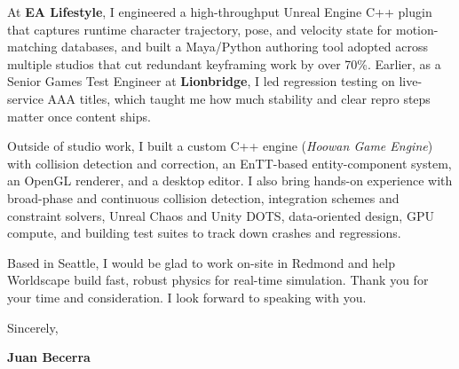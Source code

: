 \documentclass[letterpaper,11pt]{article}
\begin{document}
At \textbf{EA Lifestyle}, I engineered a high-throughput Unreal Engine C++ plugin that captures runtime character
trajectory, pose, and velocity state for motion-matching databases, and built a Maya/Python authoring tool
adopted across multiple studios that cut redundant keyframing work by over 70\%. Earlier, as a Senior Games
Test Engineer at \textbf{Lionbridge}, I led regression testing on live-service AAA titles, which taught me how
much stability and clear repro steps matter once content ships.

Outside of studio work, I built a custom C++ engine (\emph{Hoowan Game Engine}) with collision detection and
correction, an EnTT-based entity-component system, an OpenGL renderer, and a desktop editor. I also bring
hands-on experience with broad-phase and continuous collision detection, integration schemes and constraint
solvers, Unreal Chaos and Unity DOTS, data-oriented design, GPU compute, and building test suites to track
down crashes and regressions.

Based in Seattle, I would be glad to work on-site in Redmond and help Worldscape build fast, robust physics
for real-time simulation. Thank you for your time and consideration. I look forward to speaking with you.

\vspace{10pt}
\noindent Sincerely,

\vspace{14pt}
\noindent \textbf{Juan Becerra}
\end{document}

